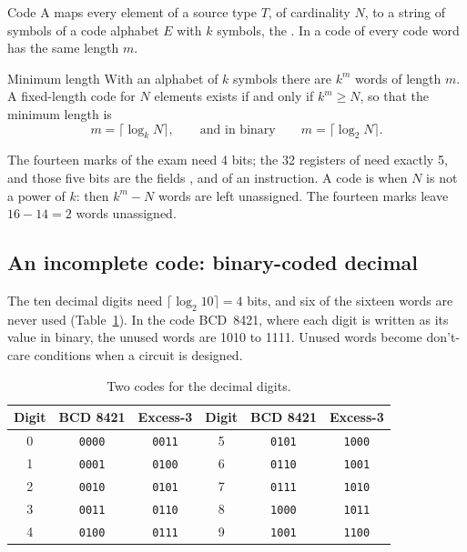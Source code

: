 \begin{definition}{Code}
A  maps every element of a source type $T$, of cardinality $N$, to
a string of symbols of a code alphabet $E$ with $k$ symbols, the . In a code of  every code word has the same length
$m$.
\end{definition}

\begin{theorem}{Minimum length}
With an alphabet of $k$ symbols there are $k^{m}$ words of length $m$. A
fixed-length code for $N$ elements exists if and only if $k^{m}\ge N$, so that
the minimum length is
\[ m=\lceil \log_k N\rceil,\qquad\text{and in binary}\qquad m=\lceil\log_2 N\rceil . \]
\end{theorem}

The fourteen marks of the exam need 4 bits; the 32 registers of \riscv need
exactly 5, and those five bits are the fields ,  and
 of an instruction. A code is  when $N$ is not a
power of $k$: then $k^{m}-N$ words are left unassigned. The fourteen marks
leave $16-14=2$ words unassigned.

\subsection{An incomplete code: binary-coded decimal}

The ten decimal digits need $\lceil\log_2 10\rceil=4$ bits, and six of the
sixteen words are never used (Table~\ref{tab:cm:bcd}). In the code BCD~8421,
where each digit is written as its value in binary, the unused words are 1010
to 1111. Unused words become don't-care conditions when a circuit is designed.

\begin{table}[htb]
\centering\small
\caption{Two codes for the decimal digits.}\label{tab:cm:bcd}
\begin{tabular}{@{}ccc@{\qquad\qquad}ccc@{}}
\toprule
\textbf{Digit} & \textbf{BCD 8421} & \textbf{Excess-3} & \textbf{Digit} & \textbf{BCD 8421} & \textbf{Excess-3}\\
\midrule
0 & \texttt{0000} & \texttt{0011} & 5 & \texttt{0101} & \texttt{1000}\\
1 & \texttt{0001} & \texttt{0100} & 6 & \texttt{0110} & \texttt{1001}\\
2 & \texttt{0010} & \texttt{0101} & 7 & \texttt{0111} & \texttt{1010}\\
3 & \texttt{0011} & \texttt{0110} & 8 & \texttt{1000} & \texttt{1011}\\
4 & \texttt{0100} & \texttt{0111} & 9 & \texttt{1001} & \texttt{1100}\\
\bottomrule
\end{tabular}
\end{table}

